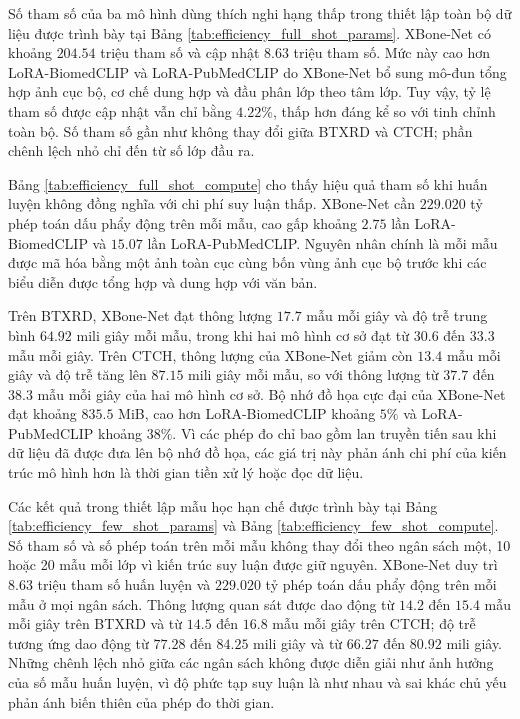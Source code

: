 Số tham số của ba mô hình dùng thích nghi hạng thấp trong thiết lập toàn bộ dữ liệu được trình bày tại Bảng \ref{tab:efficiency_full_shot_params}. XBone-Net có khoảng $204{.}54$ triệu tham số và cập nhật $8{.}63$ triệu tham số. Mức này cao hơn LoRA-BiomedCLIP và LoRA-PubMedCLIP do XBone-Net bổ sung mô-đun tổng hợp ảnh cục bộ, cơ chế dung hợp và đầu phân lớp theo tâm lớp. Tuy vậy, tỷ lệ tham số được cập nhật vẫn chỉ bằng $4{.}22\%$, thấp hơn đáng kể so với tinh chỉnh toàn bộ. Số tham số gần như không thay đổi giữa BTXRD và CTCH; phần chênh lệch nhỏ chỉ đến từ số lớp đầu ra.



Bảng \ref{tab:efficiency_full_shot_compute} cho thấy hiệu quả tham số khi huấn luyện không đồng nghĩa với chi phí suy luận thấp. XBone-Net cần $229{.}020$ tỷ phép toán dấu phẩy động trên mỗi mẫu, cao gấp khoảng $2{.}75$ lần LoRA-BiomedCLIP và $15{.}07$ lần LoRA-PubMedCLIP. Nguyên nhân chính là mỗi mẫu được mã hóa bằng một ảnh toàn cục cùng bốn vùng ảnh cục bộ trước khi các biểu diễn được tổng hợp và dung hợp với văn bản.

Trên BTXRD, XBone-Net đạt thông lượng $17{.}7$ mẫu mỗi giây và độ trễ trung bình $64{.}92$ mili giây mỗi mẫu, trong khi hai mô hình cơ sở đạt từ $30{.}6$ đến $33{.}3$ mẫu mỗi giây. Trên CTCH, thông lượng của XBone-Net giảm còn $13{.}4$ mẫu mỗi giây và độ trễ tăng lên $87{.}15$ mili giây mỗi mẫu, so với thông lượng từ $37{.}7$ đến $38{.}3$ mẫu mỗi giây của hai mô hình cơ sở. Bộ nhớ đồ họa cực đại của XBone-Net đạt khoảng $835{.}5$ MiB, cao hơn LoRA-BiomedCLIP khoảng $5\%$ và LoRA-PubMedCLIP khoảng $38\%$. Vì các phép đo chỉ bao gồm lan truyền tiến sau khi dữ liệu đã được đưa lên bộ nhớ đồ họa, các giá trị này phản ánh chi phí của kiến trúc mô hình hơn là thời gian tiền xử lý hoặc đọc dữ liệu.

Các kết quả trong thiết lập mẫu học hạn chế được trình bày tại Bảng \ref{tab:efficiency_few_shot_params} và Bảng \ref{tab:efficiency_few_shot_compute}. Số tham số và số phép toán trên mỗi mẫu không thay đổi theo ngân sách một, 10 hoặc 20 mẫu mỗi lớp vì kiến trúc suy luận được giữ nguyên. XBone-Net duy trì $8{.}63$ triệu tham số huấn luyện và $229{.}020$ tỷ phép toán dấu phẩy động trên mỗi mẫu ở mọi ngân sách. Thông lượng quan sát được dao động từ $14{.}2$ đến $15{.}4$ mẫu mỗi giây trên BTXRD và từ $14{.}5$ đến $16{.}8$ mẫu mỗi giây trên CTCH; độ trễ tương ứng dao động từ $77{.}28$ đến $84{.}25$ mili giây và từ $66{.}27$ đến $80{.}92$ mili giây. Những chênh lệch nhỏ giữa các ngân sách không được diễn giải như ảnh hưởng của số mẫu huấn luyện, vì độ phức tạp suy luận là như nhau và sai khác chủ yếu phản ánh biến thiên của phép đo thời gian.

